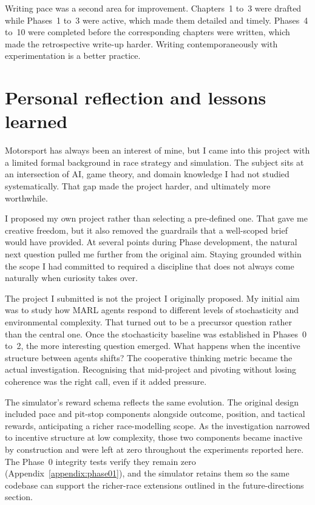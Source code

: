 \begin{appendices}
Writing pace was a second area for improvement. Chapters~1 to~3 were drafted while Phases~1 to~3 were active, which made them detailed and timely. Phases~4 to~10 were completed before the corresponding chapters were written, which made the retrospective write-up harder. Writing contemporaneously with experimentation is a better practice.

\section{Personal reflection and lessons learned}

Motorsport has always been an interest of mine, but I came into this project with a limited formal background in race strategy and simulation. The subject sits at an intersection of AI, game theory, and domain knowledge I had not studied systematically. That gap made the project harder, and ultimately more worthwhile.

I proposed my own project rather than selecting a pre-defined one. That gave me creative freedom, but it also removed the guardrails that a well-scoped brief would have provided. At several points during Phase development, the natural next question pulled me further from the original aim. Staying grounded within the scope I had committed to required a discipline that does not always come naturally when curiosity takes over.

The project I submitted is not the project I originally proposed. My initial aim was to study how MARL agents respond to different levels of stochasticity and environmental complexity. That turned out to be a precursor question rather than the central one. Once the stochasticity baseline was established in Phases~0 to~2, the more interesting question emerged. What happens when the incentive structure between agents shifts? The cooperative thinking metric became the actual investigation. Recognising that mid-project and pivoting without losing coherence was the right call, even if it added pressure.

The simulator's reward schema reflects the same evolution. The original design included pace and pit-stop components alongside outcome, position, and tactical rewards, anticipating a richer race-modelling scope. As the investigation narrowed to incentive structure at low complexity, those two components became inactive by construction and were left at zero throughout the experiments reported here. The Phase~0 integrity tests verify they remain zero (Appendix~\ref{appendix:phase01}), and the simulator retains them so the same codebase can support the richer-race extensions outlined in the future-directions section.


\end{appendices}
